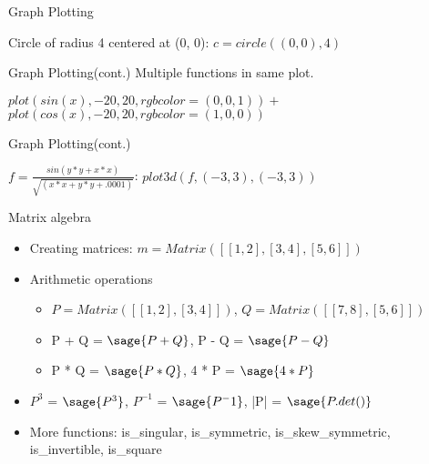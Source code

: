 \documentclass{beamer}
\begin{document}
\begin{frame}{Graph Plotting}
  \begin{center}
    Circle of radius 4 centered at (0, 0): $c = circle((0, 0), 4)$
  \end{center}
\end{frame}

\begin{frame}{Graph Plotting(cont.)}
  \centering Multiple functions in same plot.
  \begin{center}
    $plot(sin(x), -20, 20, rgbcolor = (0, 0, 1)) +$ \\ $plot(cos(x), -20, 20, rgbcolor = (1, 0, 0))$
  \end{center}
\end{frame}

\begin{frame}{Graph Plotting(cont.)}
  \begin{center}
    $f = \frac{sin(y*y+x*x)}{\sqrt{(x*x+y*y+.0001)}}$: $plot3d(f, (-3, 3), (-3, 3))$
  \end{center}
\end{frame}

\begin{frame}{Matrix algebra}
  \begin{itemize}
   \item Creating matrices: $m = Matrix([[1,2],[3,4],[5,6]])$
   \item Arithmetic operations
   \begin{itemize}
    \item $P = Matrix([[1, 2], [3, 4]])$, $Q = Matrix([[7, 8], [5, 6]])$
    \item P + Q = $\sage{P + Q}$, P - Q = $\sage{P - Q}$
    \item P * Q = $\sage{P * Q}$, 4 * P = $\sage{4 * P}$
   \end{itemize}
   \item $P^{3}$ = $\sage{P^3}$, $P^{-1}$ = $\sage{P^-1}$, |P| = $\sage{P.det()}$
   \item More functions: is\_singular, is\_symmetric, is\_skew\_symmetric, is\_invertible, is\_square
  \end{itemize}
\end{frame}
\end{document}
